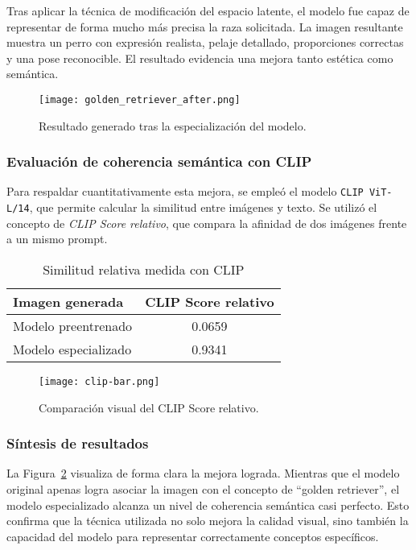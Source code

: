 Tras aplicar la técnica de modificación del espacio latente, el modelo fue capaz de representar de forma mucho más precisa la raza solicitada. La imagen resultante muestra un perro con expresión realista, pelaje detallado, proporciones correctas y una pose reconocible. El resultado evidencia una mejora tanto estética como semántica.

\begin{figure}[H]
    \centering
    \texttt{[image: golden\_retriever\_after.png]}
    \caption{Resultado generado tras la especialización del modelo.}
    \label{fig:golden-after}
\end{figure}

\subsubsection{Evaluación de coherencia semántica con CLIP}

Para respaldar cuantitativamente esta mejora, se empleó el modelo \texttt{CLIP ViT-L/14}, que permite calcular la similitud entre imágenes y texto. Se utilizó el concepto de \textit{CLIP Score relativo}, que compara la afinidad de dos imágenes frente a un mismo prompt.

\begin{table}[H]
\centering
\renewcommand{\arraystretch}{1.5}
\begin{tabular}{|p{6cm}|c|}
\hline
\rowcolor{gray!30}
\textbf{Imagen generada} & \textbf{CLIP Score relativo} \\
\hline
Modelo preentrenado & 0.0659 \\
\hline
Modelo especializado & 0.9341 \\
\hline
\end{tabular}
\caption{Similitud relativa medida con CLIP}
\label{tab:clip-golden}
\end{table}

\begin{figure}[H]
    \centering
    \texttt{[image: clip-bar.png]}
    \caption{Comparación visual del CLIP Score relativo.}
    \label{fig:clip-bar}
\end{figure}

\subsubsection{Síntesis de resultados}

La Figura~\ref{fig:clip-bar} visualiza de forma clara la mejora lograda. Mientras que el modelo original apenas logra asociar la imagen con el concepto de “golden retriever”, el modelo especializado alcanza un nivel de coherencia semántica casi perfecto. Esto confirma que la técnica utilizada no solo mejora la calidad visual, sino también la capacidad del modelo para representar correctamente conceptos específicos.


